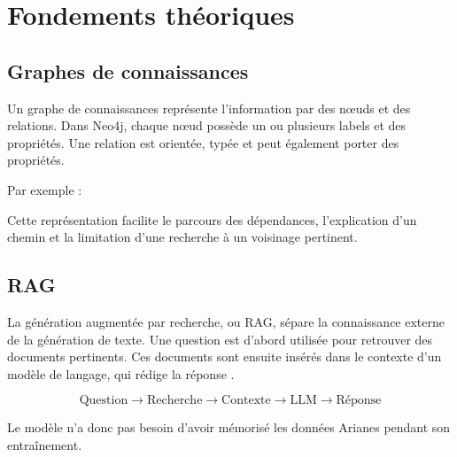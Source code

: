 \chapter{Fondements théoriques}

\section{Graphes de connaissances}

Un graphe de connaissances représente l'information par des nœuds et des relations. Dans Neo4j, chaque nœud possède un ou plusieurs labels et des propriétés. Une relation est orientée, typée et peut également porter des propriétés.

Par exemple :

\begin{center}
\end{center}

Cette représentation facilite le parcours des dépendances, l'explication d'un chemin et la limitation d'une recherche à un voisinage pertinent.

\section{RAG}

La génération augmentée par recherche, ou RAG, sépare la connaissance externe de la génération de texte. Une question est d'abord utilisée pour retrouver des documents pertinents. Ces documents sont ensuite insérés dans le contexte d'un modèle de langage, qui rédige la réponse \cite{lewis2020rag}.

\begin{equation}
\text{Question}\rightarrow\text{Recherche}\rightarrow\text{Contexte}\rightarrow\text{LLM}\rightarrow\text{Réponse}
\end{equation}

Le modèle n'a donc pas besoin d'avoir mémorisé les données Arianes pendant son entraînement.

